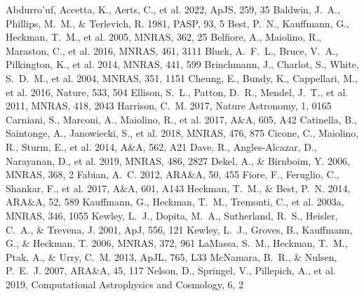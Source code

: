 \documentclass[twocolumn]{aastex631}
\begin{document}
\begin{thebibliography}{}
 Abdurro'uf, Accetta, K., Aerts, C., et al. 2022, ApJS, 259, 35
 Baldwin, J.~A., Phillips, M.~M., \& Terlevich, R. 1981, PASP, 93, 5
 Best, P.~N., Kauffmann, G., Heckman, T.~M., et al. 2005, MNRAS, 362, 25
 Belfiore, A., Maiolino, R., Maraston, C., et al. 2016, MNRAS, 461, 3111
 Bluck, A.~F.~L., Bruce, V.~A., Pilkington, K., et al. 2014, MNRAS, 441, 599
 Brinchmann, J., Charlot, S., White, S.~D.~M., et al. 2004, MNRAS, 351, 1151
 Cheung, E., Bundy, K., Cappellari, M., et al. 2016, Nature, 533, 504
 Ellison, S.~L., Patton, D.~R., Mendel, J.~T., et al. 2011, MNRAS, 418, 2043
 Harrison, C.~M. 2017, Nature Astronomy, 1, 0165
 Carniani, S., Marconi, A., Maiolino, R., et al. 2017, A\&A, 605, A42
 Catinella, B., Saintonge, A., Janowiecki, S., et al. 2018, MNRAS, 476, 875
 Cicone, C., Maiolino, R., Sturm, E., et al. 2014, A\&A, 562, A21
 Dave, R., Angles-Alcazar, D., Narayanan, D., et al. 2019, MNRAS, 486, 2827
 Dekel, A., \& Birnboim, Y. 2006, MNRAS, 368, 2
 Fabian, A.~C. 2012, ARA\&A, 50, 455
 Fiore, F., Feruglio, C., Shankar, F., et al. 2017, A\&A, 601, A143
 Heckman, T.~M., \& Best, P.~N. 2014, ARA\&A, 52, 589
 Kauffmann, G., Heckman, T.~M., Tremonti, C., et al. 2003a, MNRAS, 346, 1055
 Kewley, L.~J., Dopita, M.~A., Sutherland, R.~S., Heisler, C.~A., \& Trevena, J. 2001, ApJ, 556, 121
 Kewley, L.~J., Groves, B., Kauffmann, G., \& Heckman, T. 2006, MNRAS, 372, 961
 LaMassa, S.~M., Heckman, T.~M., Ptak, A., \& Urry, C.~M. 2013, ApJL, 765, L33
 McNamara, B.~R., \& Nulsen, P.~E.~J. 2007, ARA\&A, 45, 117
 Nelson, D., Springel, V., Pillepich, A., et al. 2019, Computational Astrophysics and Cosmology, 6, 2

\end{thebibliography}
\end{document}
